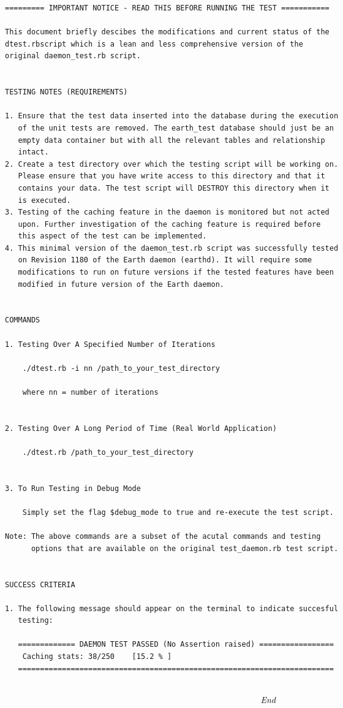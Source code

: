\documentclass[oneside, 10pt, a4]{article}
\newenvironment{mylisting}
{\begin{list}{}{\setlength{\leftmargin}{1em}}\item\scriptsize\bfseries}
{\end{list}}
\begin{document}
\begin{mylisting}
\begin{verbatim}
========= IMPORTANT NOTICE - READ THIS BEFORE RUNNING THE TEST ===========

This document briefly descibes the modifications and current status of the
dtest.rbscript which is a lean and less comprehensive version of the
original daemon_test.rb script.


TESTING NOTES (REQUIREMENTS)

1. Ensure that the test data inserted into the database during the execution
   of the unit tests are removed. The earth_test database should just be an 
   empty data container but with all the relevant tables and relationship 
   intact.
2. Create a test directory over which the testing script will be working on.
   Please ensure that you have write access to this directory and that it
   contains your data. The test script will DESTROY this directory when it
   is executed.
3. Testing of the caching feature in the daemon is monitored but not acted
   upon. Further investigation of the caching feature is required before
   this aspect of the test can be implemented.
4. This minimal version of the daemon_test.rb script was successfully tested
   on Revision 1180 of the Earth daemon (earthd). It will require some 
   modifications to run on future versions if the tested features have been
   modified in future version of the Earth daemon.


COMMANDS

1. Testing Over A Specified Number of Iterations

    ./dtest.rb -i nn /path_to_your_test_directory

    where nn = number of iterations


2. Testing Over A Long Period of Time (Real World Application)

    ./dtest.rb /path_to_your_test_directory


3. To Run Testing in Debug Mode

    Simply set the flag $debug_mode to true and re-execute the test script.

Note: The above commands are a subset of the acutal commands and testing 
      options that are available on the original test_daemon.rb test script.


SUCCESS CRITERIA

1. The following message should appear on the terminal to indicate succesful
   testing:

   ============= DAEMON TEST PASSED (No Assertion raised) =================
    Caching stats: 38/250    [15.2 % ]
   ========================================================================
   
\end{verbatim}
\end{mylisting}

\[\emph{End}\]
\end{document}

